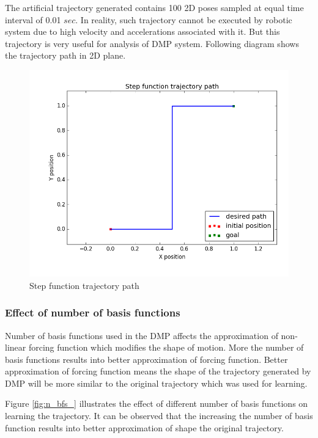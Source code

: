 The artificial trajectory generated contains 100 2D poses sampled at equal time interval of 0.01 $sec$. In reality, such trajectory cannot be executed by robotic system due to high velocity and accelerations associated with it. But this trajectory is very useful for analysis of DMP system. Following diagram shows the trajectory path in 2D plane.  

\begin{figure}[H]
	\centering
	\includegraphics[scale=0.5]{images/step_function.png}
	\caption{Step function trajectory path}
	\label{fig:step_function}
\end{figure}

\subsubsection{Effect of number of basis functions}

Number of basis functions used in the DMP affects the approximation of non-linear forcing function which modifies the shape of motion. More the number of basis functions results into better approximation of forcing function. Better approximation of forcing function means the shape of the trajectory generated by DMP will be more similar to the original trajectory which was used for learning. 

Figure \ref{fig:n_bfs_} illustrates the effect of different number of basis functions on 
learning the trajectory. It can be observed that the increasing the number of basis function results into better approximation of shape the original trajectory.  

